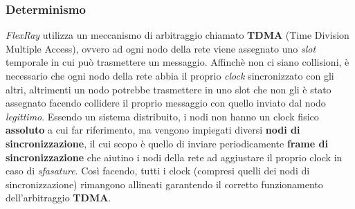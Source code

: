 \subsubsection{Determinismo}
\emph{FlexRay} utilizza un meccanismo di arbitraggio chiamato \textbf{TDMA} (Time Division Multiple Access), ovvero ad ogni nodo della rete viene assegnato uno \emph{slot} temporale in cui può trasmettere un messaggio. Affinchè non ci siano collisioni, è necessario che ogni nodo della rete abbia il proprio \emph{clock} sincronizzato con gli altri, altrimenti un nodo potrebbe trasmettere in uno slot che non gli è stato assegnato facendo collidere il proprio messaggio con quello inviato dal nodo \emph{legittimo}. Essendo un sistema distribuito, i nodi non hanno un clock fisico \textbf{assoluto} a cui far riferimento, ma vengono impiegati diversi \textbf{nodi di sincronizzazione}, il cui scopo è quello di inviare periodicamente \textbf{frame di sincronizzazione} che aiutino i nodi della rete ad aggiustare il proprio clock in caso di \emph{sfasature}. Così facendo, tutti i clock (compresi quelli dei nodi di sincronizzazione) rimangono allineati garantendo il corretto funzionamento dell'arbitraggio \textbf{TDMA}. \cite{eos_flexray}

